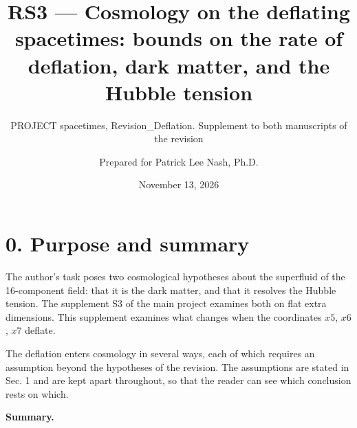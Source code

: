 \documentclass[
  10pt,
]{article}
\title{RS3 --- Cosmology on the deflating spacetimes: bounds on the rate
of deflation, dark matter, and the Hubble tension}
\subtitle{PROJECT spacetimes, Revision\_Deflation. Supplement to both
manuscripts of the revision}
\author{Prepared for Patrick Lee Nash, Ph.D.}
\date{November 13, 2026}
\begin{document}
\maketitle

\hypertarget{purpose-and-summary}{%
\section{0. Purpose and summary}\label{purpose-and-summary}}

The author's task poses two cosmological hypotheses about the superfluid
of the 16-component field: that it is the dark matter, and that it
resolves the Hubble tension. The supplement S3 of the main project
examines both on flat extra dimensions. This supplement examines what
changes when the coordinates \(x5\), \(x6\), \(x7\) deflate.

The deflation enters cosmology in several ways, each of which requires
an assumption beyond the hypotheses of the revision. The assumptions are
stated in Sec. 1 and are kept apart throughout, so that the reader can
see which conclusion rests on which.

\textbf{Summary.}
\end{document}
